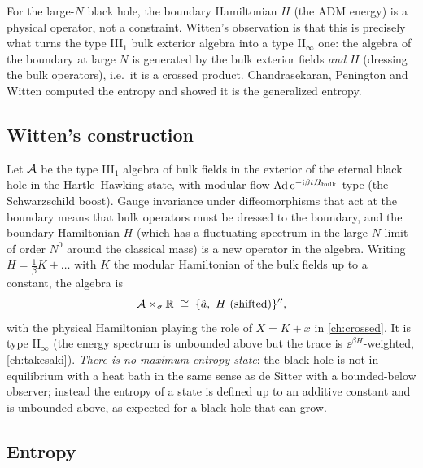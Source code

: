 \begin{physmotiv}
For the large-$N$ black hole, the boundary Hamiltonian $H$ (the ADM energy) is a physical operator, not a constraint. Witten's observation is that this is precisely what turns the type III$_1$ bulk exterior algebra into a type II$_\infty$ one: the algebra of the boundary at large $N$ is generated by the bulk exterior fields \emph{and} $H$ (dressing the bulk operators), i.e.\ it is a crossed product. Chandrasekaran, Penington and Witten computed the entropy and showed it is the generalized entropy.
\end{physmotiv}

\subsection{Witten's construction}

Let $\mathcal{A}$ be the type III$_1$ algebra of bulk fields in the exterior of the eternal black hole in the Hartle--Hawking state, with modular flow $\operatorname{Ad}\mathrm{e}^{-\mathrm{i}\beta tH_{\rm bulk}}$-type (the Schwarzschild boost). Gauge invariance under diffeomorphisms that act at the boundary means that bulk operators must be dressed to the boundary, and the boundary Hamiltonian $H$ (which has a fluctuating spectrum in the large-$N$ limit of order $N^0$ around the classical mass) is a new operator in the algebra. Writing $H=\frac{1}{\beta}K+\ldots$ with $K$ the modular Hamiltonian of the bulk fields up to a constant, the algebra is
\begin{equation}
\A\rtimes_\sigma\R\;\cong\;\{\hat a,\ H\ \text{(shifted)}\}'',
\end{equation}
with the physical Hamiltonian playing the role of $X=K+x$ in \cref{ch:crossed}. It is type II$_\infty$ (the energy spectrum is unbounded above but the trace is $\ee^{\beta H}$-weighted, \cref{ch:takesaki}). \emph{There is no maximum-entropy state}: the black hole is not in equilibrium with a heat bath in the same sense as de Sitter with a bounded-below observer; instead the entropy of a state is defined up to an additive constant and is unbounded above, as expected for a black hole that can grow.

\subsection{Entropy}

